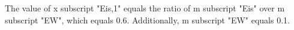 The value of x subscript "Eis,1" equals the ratio of m subscript "Eis" over m subscript "EW", which equals 0.6. Additionally, m subscript "EW" equals 0.1.